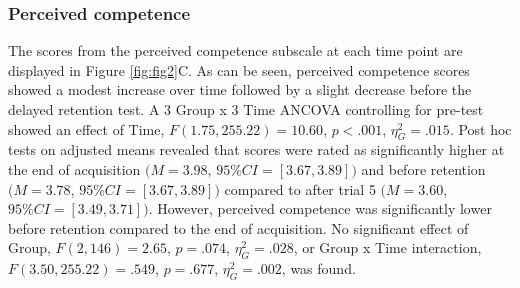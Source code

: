 \documentclass[
  english,
  man,floatsintext]{apa7}
\begin{document}
\hypertarget{perceived-competence}{%
\subsubsection{Perceived competence}\label{perceived-competence}}

The scores from the perceived competence subscale at each time point are displayed in Figure \ref{fig:fig2}C. As can be seen, perceived competence scores showed a modest increase over time followed by a slight decrease before the delayed retention test. A 3 Group x 3 Time ANCOVA controlling for pre-test showed an effect of Time, \(F(1.75,255.22) = 10.60\), \(p < .001\), \(\eta^2_{G} = .015\). Post hoc tests on adjusted means revealed that scores were rated as significantly higher at the end of acquisition \((M = 3.98\), \(95\%CI = [3.67,3.89])\) and before retention \((M = 3.78\), \(95\%CI = [3.67,3.89])\) compared to after trial 5 \((M = 3.60\), \(95\%CI = [3.49,3.71])\). However, perceived competence was significantly lower before retention compared to the end of acquisition. No significant effect of Group, \(F(2,146) = 2.65\), \(p = .074\), \(\eta^2_{G} = .028\), or Group x Time interaction, \(F(3.50,255.22) = .549\), \(p = .677\), \(\eta^2_{G} = .002\), was found.
\end{document}
